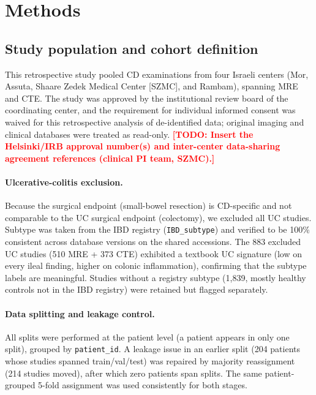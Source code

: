 \documentclass[11pt]{article}
\newcommand{\TODO}[1]{\textcolor{red}{\textbf{[TODO: #1]}}}
\begin{document}
\section*{Methods}
\label{sec:methods}

\subsection*{Study population and cohort definition}

This retrospective study pooled CD examinations from four Israeli centers (Mor, Assuta, Shaare Zedek
Medical Center [SZMC], and Rambam), spanning MRE and CTE. The study was approved by the institutional
review board of the coordinating center, and the requirement for individual informed consent was waived
for this retrospective analysis of de-identified data; original imaging and clinical databases were
treated as read-only. \TODO{Insert the Helsinki/IRB approval number(s) and inter-center data-sharing
agreement references (clinical PI team, SZMC).}

\paragraph{Ulcerative-colitis exclusion.}
Because the surgical endpoint (small-bowel resection) is CD-specific and not comparable to the UC surgical
endpoint (colectomy), we excluded all UC studies. Subtype was taken from the IBD registry (\texttt{IBD\_subtype})
and verified to be 100\% consistent across database versions on the shared accessions. The 883 excluded UC
studies (510 MRE + 373 CTE) exhibited a textbook UC signature (low on every ileal finding, higher on colonic
inflammation), confirming that the subtype labels are meaningful. Studies without a registry subtype
(1{,}839, mostly healthy controls not in the IBD registry) were retained but flagged separately.

\paragraph{Data splitting and leakage control.}
All splits were performed at the patient level (a patient appears in only one split), grouped by
\texttt{patient\_id}. A leakage issue in an earlier split (204 patients whose studies spanned
train/val/test) was repaired by majority reassignment (214 studies moved), after which zero patients span
splits. The same patient-grouped 5-fold assignment was used consistently for both stages.
\end{document}
